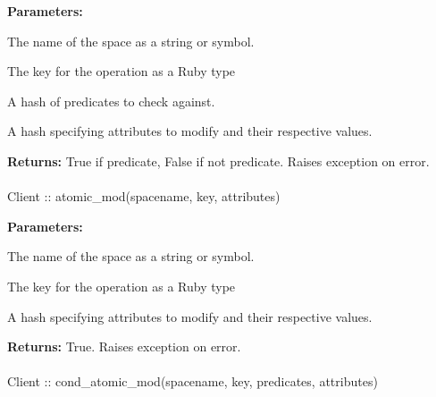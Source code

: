 \noindent\textbf{Parameters:}
\begin{description}[labelindent=\widthof{{\code{predicates}}},leftmargin=*,noitemsep,nolistsep,align=right]
\item[\code{spacename}] The name of the space as a string or symbol.
\item[\code{key}] The key for the operation as a Ruby type
\item[\code{predicates}] A hash of predicates to check against.
\item[\code{attributes}] A hash specifying attributes to modify and their respective values.
\end{description}

\noindent\textbf{Returns:}
True if predicate, False if not predicate.  Raises exception on error.

\paragraph{}
\label{api:ruby:atomic_mod}
\begin{ccode}
Client :: atomic_mod(spacename, key, attributes)
\end{ccode}
\funcdesc 

\noindent\textbf{Parameters:}
\begin{description}[labelindent=\widthof{{\code{attributes}}},leftmargin=*,noitemsep,nolistsep,align=right]
\item[\code{spacename}] The name of the space as a string or symbol.
\item[\code{key}] The key for the operation as a Ruby type
\item[\code{attributes}] A hash specifying attributes to modify and their respective values.
\end{description}

\noindent\textbf{Returns:}
True.  Raises exception on error.

\paragraph{}
\label{api:ruby:cond_atomic_mod}
\begin{ccode}
Client :: cond_atomic_mod(spacename, key, predicates, attributes)
\end{ccode}
\funcdesc 

